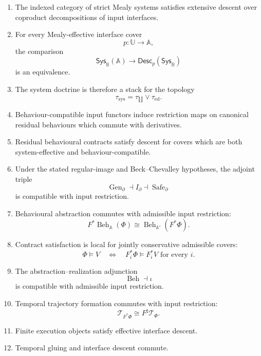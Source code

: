 \begin{theorem}
\begin{enumerate}
    \item The indexed category of strict Mealy systems satisfies extensive
    descent over coproduct decompositions of input interfaces.

    \item For every Mealy-effective interface cover
    \[
        p:\mathbb U\to\mathbb A,
    \]
    the comparison
    \[
        \mathsf{Sys}_{\mathbb B}(\mathbb A)
        \to
        \mathsf{Desc}_p(\mathsf{Sys}_{\mathbb B})
    \]
    is an equivalence.

    \item The system doctrine is therefore a stack for the topology
    \[
        \tau_{\mathrm{sys}}
        =
        \tau_{\amalg}\vee\tau_{\mathrm{ed}}.
    \]

    \item Behaviour-compatible input functors induce restriction maps on
    canonical residual behaviours which commute with derivatives.

    \item Residual behavioural contracts satisfy descent for covers which are
    both system-effective and behaviour-compatible.

    \item Under the stated regular-image and Beck--Chevalley hypotheses, the
    adjoint triple
    \[
        \operatorname{Gen}_{\partial}
        \dashv
        I_{\partial}
        \dashv
        \operatorname{Safe}_{\partial}
    \]
    is compatible with input restriction.

    \item Behavioural abstraction commutes with admissible input restriction:
    \[
        F^\ast
        \operatorname{Beh}_{\mathbb A}(\Phi)
        \cong
        \operatorname{Beh}_{\mathbb A'}(F^\ast\Phi).
    \]

    \item Contract satisfaction is local for jointly conservative admissible
    covers:
    \[
        \Phi\models V
        \quad\Longleftrightarrow\quad
        F_i^\ast\Phi\models F_i^\ast V
        \text{ for every }i.
    \]

    \item The abstraction--realization adjunction
    \[
        \operatorname{Beh}\dashv\iota
    \]
    is compatible with admissible input restriction.

    \item Temporal trajectory formation commutes with input restriction:
    \[
        \mathscr T_{F^\ast\Phi}
        \cong
        F^\sharp\mathscr T_\Phi.
    \]

    \item Finite execution objects satisfy effective interface descent.

    \item Temporal gluing and interface descent commute.
\end{enumerate}
\end{theorem}

